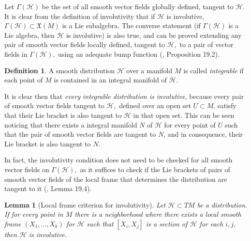 \documentclass[12pt, letterpaper, reqno]{amsart}
\theoremstyle{definition}
\newtheorem{df}{Definition}
\theoremstyle{plain}
\newtheorem{lm}{Lemma}
\theoremstyle{remark}
\begin{document}
Let $ \Gamma(\mathcal{H}) $ be the set of all smooth vector fields globally defined, tangent to $ \mathcal{H}. $ It is clear from the definition of involutivity that if $ \mathcal{H} $ is involutive, $ \Gamma (\mathcal{H})\subset \mathfrak{X}(M) $ is a Lie subalgebra. The converse statement (if $ \Gamma(\mathcal{H}) $ is a Lie algebra, then $ \mathcal{H} $ is involutive) is also true, and can be proved extending any pair of smooth vector fields locally defined, tangent to $ \mathcal{H} ,$ to a pair of vector fields in $ \Gamma( \mathcal{H}), $ using an adequate bump function (\cite{lee2003introduction}, Proposition 19.2). 

\begin{df}
	A smooth distribution $ \mathcal{H} $ over a manifold $ M $ is called \textit{integrable} if each point of $ M $ is contained in an integral manifold of $ \mathcal{H}. $  
\end{df}
It is clear then that \textit{every integrable distribution is involutive}, because every pair of smooth vector fields tangent to $ \mathcal{H}, $ defined over an open set $ U\subset M $, satisfy that their Lie bracket is also tangent to $ \mathcal{H} $ in that open set. This can be seen noticing that there exists a integral manifold $ N $  of $ \mathcal{H} $ for every point of $ U $ such that the pair of smooth vector fields are tangent to $ N $, and in consequence, their Lie bracket is also tangent to $ N. $  

In fact, the involutivity condition does not need to be checked for all smooth vector fields on $ \Gamma( \mathcal{H}), $ as it suffices to check if the Lie brackets of pairs of smooth vector fields of the local frame that determines the distribution are tangent to it (\cite{lee2003introduction}, Lemma 19.4).

\begin{lm}[Local frame criterion for involutivity] 
	Let $ \mathcal{H}\subset TM $ be a distribution. If for every point in $ M $ there is a neighborhood where there exists a local smooth frame $ (X_1,\dots, X_k) $ for $ \mathcal{H} $ such that $ [X_i,X_j] $ is a section of $ \mathcal{H} $ for each $ i,j, $ then $ \mathcal{H} $ is involutive.
\end{lm}
\end{document}
